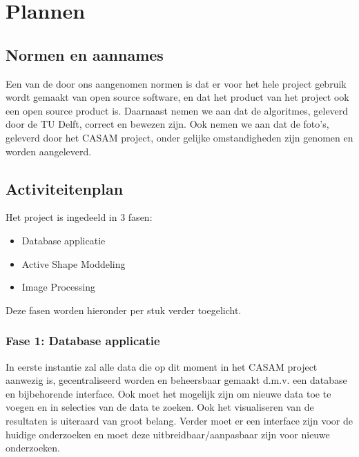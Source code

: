 \section{Plannen}

\subsection{Normen en aannames}
Een van de door ons aangenomen normen is dat er voor het hele project gebruik wordt gemaakt van open source software, en dat het product van het project ook een open source product is. 
Daarnaast nemen we aan dat de algoritmes, geleverd door de TU Delft, correct en bewezen zijn.
Ook nemen we aan dat de foto's, geleverd door het CASAM project, onder gelijke omstandigheden zijn genomen en worden aangeleverd.

\subsection{Activiteitenplan}
Het project is ingedeeld in 3 fasen:
\begin{itemize}
	\item Database applicatie
	\item Active Shape Moddeling
	\item Image Processing
\end{itemize}
Deze fasen worden hieronder per stuk verder toegelicht.

\subsubsection{Fase 1: Database applicatie}
In eerste instantie zal alle data die op dit moment in het CASAM project aanwezig is, gecentraliseerd worden en beheersbaar gemaakt d.m.v. een database en bijbehorende interface. 
Ook moet het mogelijk zijn om nieuwe data toe te voegen en in selecties van de data te zoeken. 
Ook het visualiseren van de resultaten is uiteraard van groot belang. 
Verder moet er een interface zijn voor de huidige onderzoeken en moet deze uitbreidbaar/aanpasbaar zijn voor nieuwe onderzoeken.

